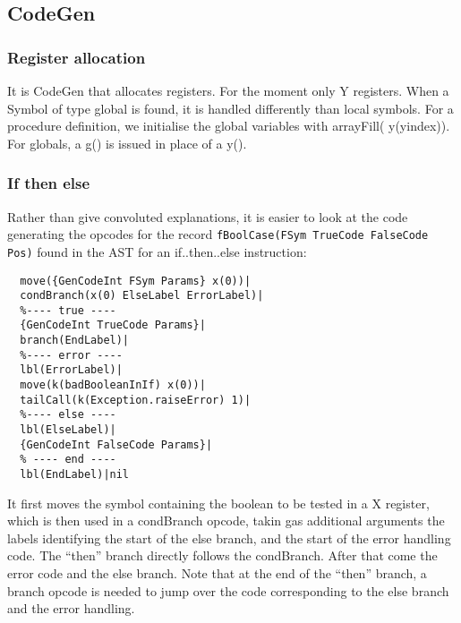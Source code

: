 \documentclass[a4paper]{memoir}
\begin{document}
\subsection{CodeGen}
\subsubsection{Register allocation}
It is CodeGen that allocates registers. For the moment only Y registers.
When a Symbol of type global is found, it is handled differently than local symbols.
For a procedure definition, we initialise the global variables with arrayFill( y(yindex)). 
For globals, a g() is issued in place of a y(). 
\subsubsection{If then else}
Rather than give convoluted explanations, it is easier to look at the code generating the opcodes for the record \lstinline!fBoolCase(FSym TrueCode FalseCode Pos)! found in the AST for an if..then..else instruction:
\begin{lstlisting}
  move({GenCodeInt FSym Params} x(0))|
  condBranch(x(0) ElseLabel ErrorLabel)|
  %---- true ----
  {GenCodeInt TrueCode Params}|
  branch(EndLabel)|
  %---- error ----
  lbl(ErrorLabel)|
  move(k(badBooleanInIf) x(0))|
  tailCall(k(Exception.raiseError) 1)|
  %---- else ----
  lbl(ElseLabel)|
  {GenCodeInt FalseCode Params}|
  % ---- end ----
  lbl(EndLabel)|nil
\end{lstlisting}
It first moves the symbol containing the boolean to be tested in a X register, which is then used in a condBranch opcode, takin gas additional arguments the labels identifying the start of the else branch, and the start of the error handling code. The ``then'' branch directly follows the condBranch. After that come the error code and the else branch. Note that at the end of the ``then'' branch, a branch opcode is needed to jump over the code corresponding to the else branch and the error handling.
\end{document}
